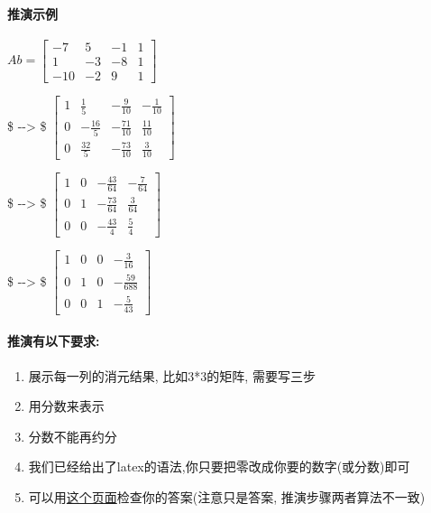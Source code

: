 \documentclass[11pt]{article}
\providecommand{\tightlist}{%
      \setlength{\itemsep}{0pt}\setlength{\parskip}{0pt}}
\begin{document}
    \paragraph{推演示例}\label{ux63a8ux6f14ux793aux4f8b}

\(Ab = \begin{bmatrix}  -7 & 5 & -1 & 1\\  1 & -3 & -8 & 1\\  -10 & -2 & 9 & 1\end{bmatrix}\)

\$ -\/-\textgreater{} \$
\(\begin{bmatrix}  1 & \frac{1}{5} & -\frac{9}{10} & -\frac{1}{10}\\  0 & -\frac{16}{5} & -\frac{71}{10} & \frac{11}{10}\\  0 & \frac{32}{5} & -\frac{73}{10} & \frac{3}{10}\end{bmatrix}\)

\$ -\/-\textgreater{} \$
\(\begin{bmatrix}  1 & 0 & -\frac{43}{64} & -\frac{7}{64}\\  0 & 1 & -\frac{73}{64} & \frac{3}{64}\\  0 & 0 & -\frac{43}{4} & \frac{5}{4}\end{bmatrix}\)

\$ -\/-\textgreater{} \$
\(\begin{bmatrix}  1 & 0 & 0 & -\frac{3}{16}\\  0 & 1 & 0 & -\frac{59}{688}\\  0 & 0 & 1 & -\frac{5}{43}\end{bmatrix}\)

\paragraph{推演有以下要求:}\label{ux63a8ux6f14ux6709ux4ee5ux4e0bux8981ux6c42}

\begin{enumerate}
\def\labelenumi{\arabic{enumi}.}
\tightlist
\item
  展示每一列的消元结果, 比如3*3的矩阵, 需要写三步
\item
  用分数来表示
\item
  分数不能再约分
\item
  我们已经给出了latex的语法,你只要把零改成你要的数字(或分数)即可
\item
  可以用\href{http://www.math.odu.edu/~bogacki/cgi-bin/lat.cgi?c=sys}{这个页面}检查你的答案(注意只是答案,
  推演步骤两者算法不一致)
\end{enumerate}
\end{document}
